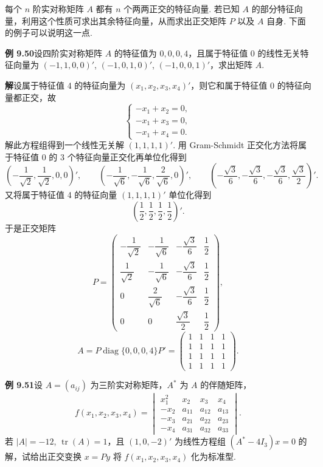 \documentclass[UTF8,12pt,a4paper,fontset=fandol]{ctexart}
\begin{document}
每个 $n$ 阶实对称矩阵 $A$ 都有 $n$ 个两两正交的特征向量. 若已知 $A$ 的部分特征向量，利用这个性质可求出其余特征向量，从而求出正交矩阵 $P$ 以及 $A$ 自身. 下面的例子可以说明这一点.

\noindent\textbf{例 9.50}\quad 设四阶实对称矩阵 $A$ 的特征值为 $0,0,0,4$，且属于特征值 0 的线性无关特征向量为 $(-1,1,0,0)'$, $(-1,0,1,0)'$, $(-1,0,0,1)'$，求出矩阵 $A$.

\noindent\textbf{解}\quad 设属于特征值 4 的特征向量为 $(x_1,x_2,x_3,x_4)'$，则它和属于特征值 0 的特征向量都正交，故
\[
\begin{cases}
-x_1+x_2=0,\\
-x_1+x_3=0,\\
-x_1+x_4=0.
\end{cases}
\]
解此方程组得到一个线性无关解 $(1,1,1,1)'$. 用 Gram-Schmidt 正交化方法将属于特征值 0 的 3 个特征向量正交化再单位化得到
\[
\left(-\frac1{\sqrt2},\frac1{\sqrt2},0,0\right)',\qquad
\left(-\frac1{\sqrt6},-\frac1{\sqrt6},\frac2{\sqrt6},0\right)',\qquad
\left(-\frac{\sqrt3}6,-\frac{\sqrt3}6,-\frac{\sqrt3}6,\frac{\sqrt3}2\right)'.
\]
又将属于特征值 4 的特征向量 $(1,1,1,1)'$ 单位化得到
\[
\left(\frac12,\frac12,\frac12,\frac12\right)'.
\]
于是正交矩阵
\[
P=\begin{pmatrix}
-\dfrac1{\sqrt2}&-\dfrac1{\sqrt6}&-\dfrac{\sqrt3}6&\dfrac12\\
\dfrac1{\sqrt2}&-\dfrac1{\sqrt6}&-\dfrac{\sqrt3}6&\dfrac12\\
0&\dfrac2{\sqrt6}&-\dfrac{\sqrt3}6&\dfrac12\\
0&0&\dfrac{\sqrt3}2&\dfrac12
\end{pmatrix},
\]
\[
A=P\operatorname{diag}\{0,0,0,4\}P'=
\begin{pmatrix}
1&1&1&1\\
1&1&1&1\\
1&1&1&1\\
1&1&1&1
\end{pmatrix}.
\]

\noindent\textbf{例 9.51}\quad 设 $A=(a_{ij})$ 为三阶实对称矩阵，$A^*$ 为 $A$ 的伴随矩阵，
\[
f(x_1,x_2,x_3,x_4)=
\begin{vmatrix}
x_1^2&x_2&x_3&x_4\\
-x_2&a_{11}&a_{12}&a_{13}\\
-x_3&a_{21}&a_{22}&a_{23}\\
-x_4&a_{31}&a_{32}&a_{33}
\end{vmatrix}.
\]
若 $|A|=-12$, $\operatorname{tr}(A)=1$，且 $(1,0,-2)'$ 为线性方程组 $(A^*-4I_3)x=0$ 的解，试给出正交变换 $x=Py$ 将 $f(x_1,x_2,x_3,x_4)$ 化为标准型.
\end{document}
